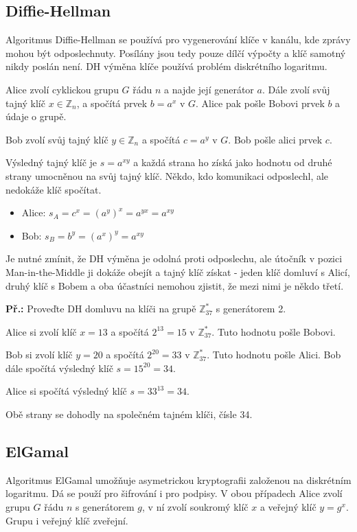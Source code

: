 \subsection{Diffie-Hellman}

Algoritmus Diffie-Hellman se používá pro vygenerování klíče v kanálu, kde zprávy
mohou být odposlechnuty. Posílány jsou tedy pouze dílčí výpočty a klíč samotný
nikdy poslán není. DH výměna klíče používá problém diskrétního logaritmu.

Alice zvolí cyklickou grupu $G$ řádu $n$ a najde její generátor $a$. Dále zvolí
svůj tajný klíč $x \in \mathbb{Z}_n$, a spočítá prvek $b = a^x$ v $G$. Alice pak
pošle Bobovi prvek $b$ a údaje o grupě.

Bob zvolí svůj tajný klíč $y \in \mathbb{Z}_n$ a spočítá $c = a^y$ v $G$. Bob
pošle alici prvek $c$.

Výsledný tajný klíč je $s = a^{xy}$ a každá strana ho získá jako hodnotu od
druhé strany umocněnou na svůj tajný klíč. Někdo, kdo komunikaci odposlechl, ale
nedokáže klíč spočítat.

\begin{itemize}
    \item Alice: $s_A = c^x = (a^y)^x = a^{yx} = a^{xy}$
    \item Bob: $s_B = b^y = (a^x)^y = a^{xy}$
\end{itemize}

Je nutné zmínit, že DH výměna je odolná proti odposlechu, ale útočník v pozici
Man-in-the-Middle ji dokáže obejít a tajný klíč získat - jeden klíč domluví s
Alicí, druhý klíč s Bobem a oba účastníci nemohou zjistit, že mezi nimi je někdo
třetí.

\begin{exercise}
    \textbf{Př.:} Proveďte DH domluvu na klíči na grupě $\mathbb{Z}_{37}^*$ s
    generátorem 2.

    Alice si zvolí klíč $x = 13$ a spočítá $2^{13} = 15$ v $\mathbb{Z}_{37}^*$. Tuto
    hodnotu pošle Bobovi.

    Bob si zvolí klíč $y = 20$ a spočítá $2^{20} = 33$ v $\mathbb{Z}_{37}^*$. Tuto
    hodnotu pošle Alici. Bob dále spočítá výsledný klíč $s = 15^{20} = 34$.

    Alice si spočítá výsledný klíč $s = 33^{13} = 34$.

    Obě strany se dohodly na společném tajném klíči, čísle 34.

\end{exercise}

\subsection{ElGamal}
Algoritmus ElGamal umožňuje asymetrickou kryptografii založenou na diskrétním
logaritmu. Dá se použí pro šifrování i pro podpisy. V obou případech Alice
zvolí grupu $G$ řádu $n$ s generátorem $g$, v ní zvolí soukromý klíč $x$ a
veřejný klíč $y=g^x$. Grupu i veřejný klíč zveřejní.

